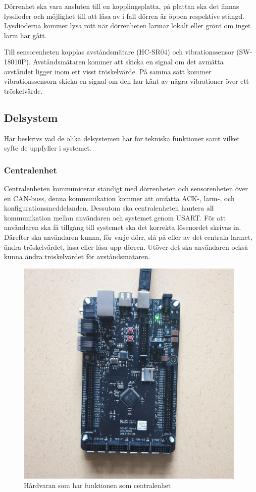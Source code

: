 \documentclass{article}
\begin{document}
\newpage

Dörrenhet ska vara ansluten till en kopplingsplatta, på plattan ska det finnas lysdioder och möjlighet till att läsa av i fall dörren är öppen respektive stängd.
Lysdioderna kommer lysa rött när dörrenheten larmar lokalt eller grönt om inget larm har gått.

Till sensorenheten kopplas avståndsmätare (HC-SR04) och vibrationssensor (SW-18010P).
Avståndsmätaren kommer att skicka en signal om det avmätta avståndet ligger inom ett visst tröskelvärde.
På samma sätt kommer vibrationssensorn skicka en signal om den har känt av några vibrationer över ett tröskelvärde.

\subsection{Delsystem}
Här beskrivs vad de olika delsystemen har för tekniska funktioner samt vilket syfte de uppfyller i systemet.

\subsubsection{Centralenhet}
Centralenheten kommunicerar ständigt med dörrenheten och sensorenheten över en CAN-buss, denna kommunikation kommer att omfatta ACK-, larm-, och konfigurationsmeddelanden. 
Dessutom ska centralenheten hantera all kommunikation mellan användaren och systemet genom USART. För att användaren ska få tillgång till systemet ska det korrekta lösenordet skrivas in. 
Därefter ska användaren kunna, för varje dörr, slå på eller av det centrala larmet, ändra tröskelvärdet, låsa eller låsa upp dörren. 
Utöver det ska användaren också kunna ändra tröskelvärdet för avståndsmätaren.

\begin{figure}[h]
    \centering
    \includegraphics[scale=0.05]{Projektrapport/central.png}
    \caption {Hårdvaran som har funktionen som centralenhet}
    \label{fig:drawing}
\end{figure}
\end{document}
